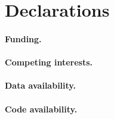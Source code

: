 \section*{Declarations}


\paragraph{Funding.}

\paragraph{Competing interests.}

\paragraph{Data availability.}

\paragraph{Code availability.}
